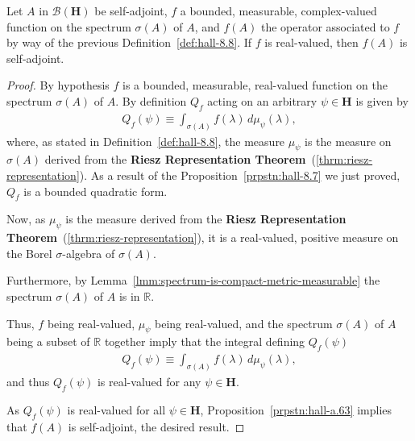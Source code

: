 \begin{lemma}
    \label{lmm:lemma-3}
    \leanok
    Let $A$ in $\mathcal{B}(\mathbf{H})$ be self-adjoint, $f$ a bounded, measurable, complex-valued function on the spectrum $\sigma(A)$ of $A$, and $f(A)$ the operator associated to $f$ by way of the previous Definition~\ref{def:hall-8.8}. If $f$ is real-valued, then $f(A)$ is self-adjoint.
\end{lemma}
\begin{proof}
    \leanok
By hypothesis $f$ is a bounded, measurable, real-valued function on the spectrum $\sigma(A)$ of $A$. By definition $Q_f$ acting on an arbitrary $\psi \in \mathbf{H}$ is given by
\begin{align}
    Q_f(\psi) \equiv \int_{\sigma(A)} f(\lambda) \, d\mu_\psi(\lambda),
\end{align}
where, as stated in Definition~\ref{def:hall-8.8}, the measure $\mu_\psi$ is the measure on $\sigma(A)$ derived from the \textbf{Riesz Representation Theorem}~(\ref{thrm:riesz-representation}). As a result of the Proposition~\ref{prpstn:hall-8.7} we just proved, $Q_f$ is a bounded quadratic form.

Now, as $\mu_\psi$ is the measure derived from the \textbf{Riesz Representation Theorem}~(\ref{thrm:riesz-representation}), it is a real-valued, positive measure on the Borel $\sigma$-algebra of $\sigma(A)$.

Furthermore, by Lemma~\ref{lmm:spectrum-is-compact-metric-measurable} the spectrum $\sigma(A)$ of $A$ is in $\mathbb{R}$.

Thus, $f$ being real-valued, $\mu_\psi$ being real-valued, and the spectrum $\sigma(A)$ of $A$ being a subset of $\mathbb{R}$ together imply that the integral defining $Q_f(\psi)$
\begin{align}
    Q_f(\psi) \equiv \int_{\sigma(A)} f(\lambda) \, d\mu_\psi(\lambda),
\end{align}
and thus $Q_f(\psi)$ is real-valued for any $\psi \in \mathbf{H}$.

As $Q_f(\psi)$ is real-valued for all $\psi \in \mathbf{H}$, Proposition~\ref{prpstn:hall-a.63} implies that $f(A)$ is self-adjoint, the desired result.
\end{proof}

